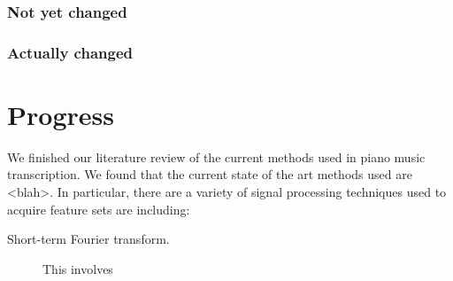 \documentclass{article}
\begin{document}
\subsubsection{Not yet changed}
\subsubsection{Actually changed}

\section{Progress}

We finished our literature review of the current methods used in piano music
transcription. We found that the current state of the art methods used are
<blah>. In particular, there are a variety of signal processing techniques used
to acquire feature sets are including:
\begin{description}
\item[Short-term Fourier transform.] This involves 
\end{description}





\end{document}
